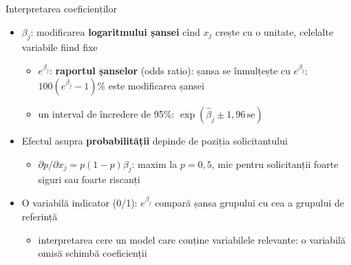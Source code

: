 \begin{frame}{Interpretarea coeficienților}
\itemsize{\small}
\begin{itemize}
    \item $\beta_j$: modificarea \textbf{logaritmului șansei} cînd $x_j$ crește cu o unitate, celelalte variabile fiind fixe
    \begin{itemize}
        \item $e^{\beta_j}$: \textbf{raportul șanselor} (odds ratio): șansa se înmulțește cu $e^{\beta_j}$; $100(e^{\beta_j} - 1)\%$ este modificarea șansei
        \item un interval de încredere de 95\%: $\exp(\hat\beta_j \pm 1{,}96\,\mathrm{se})$
    \end{itemize}
    \item Efectul asupra \textbf{probabilității} depinde de poziția solicitantului
    \begin{itemize}
        \item $\partial p/\partial x_j = p(1 - p)\beta_j$: maxim la $p = 0{,}5$, mic pentru solicitanții foarte siguri sau foarte riscanți
    \end{itemize}
    \item O variabilă indicator (0/1): $e^{\beta_j}$ compară șansa grupului cu cea a grupului de referință
    \begin{itemize}
        \item interpretarea cere un model care conține variabilele relevante: o variabilă omisă schimbă coeficienții
    \end{itemize}
\end{itemize}
\end{frame}

